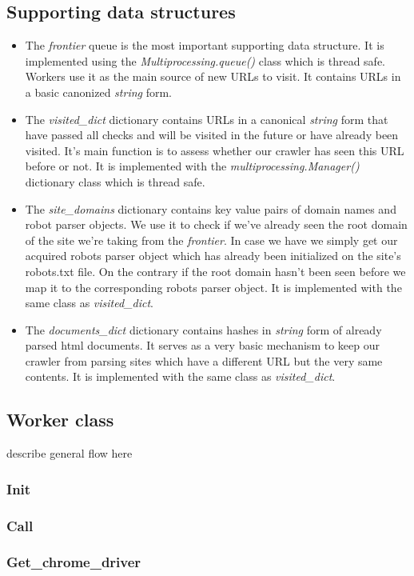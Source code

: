 \documentclass[runningheads]{llncs}
\begin{document}
\subsection{Supporting data structures}
\begin{itemize}
  \item The \textit{frontier} queue is the most important supporting data structure. It is implemented using the \textit{Multiprocessing.queue()} class which is thread safe. Workers use it as the main source of new URLs to visit. It contains URLs in a basic canonized \textit{string} form.
  \item The \textit{visited\_dict} dictionary contains URLs in a canonical \textit{string} form that have passed all checks and will be visited in the future or have already been visited. It's main function is to assess whether our crawler has seen this URL before or not. It is implemented with the \textit{multiprocessing.Manager()} dictionary class which is thread safe.
  \item The \textit{site\_domains} dictionary contains key value pairs of domain names and robot parser objects. We use it to check if we've already seen the root domain of the site we're taking from the \textit{frontier}. In case we have we simply get our acquired robots parser object which has already been initialized on the site's robots.txt file. On the contrary if the root domain hasn't been seen before we map it to the corresponding robots parser object. It is implemented with the same class as \textit{visited\_dict}.
  \item The \textit{documents\_dict} dictionary contains hashes in \textit{string} form of already parsed html documents. It serves as a very basic mechanism to keep our crawler from parsing sites which have a different URL but the very same contents. It is implemented with the same class as \textit{visited\_dict}.
\end{itemize}

\subsection{Worker class}
describe general flow here
\subsubsection{Init}
\subsubsection{Call}
\subsubsection{Get\_chrome\_driver}
\end{document}

